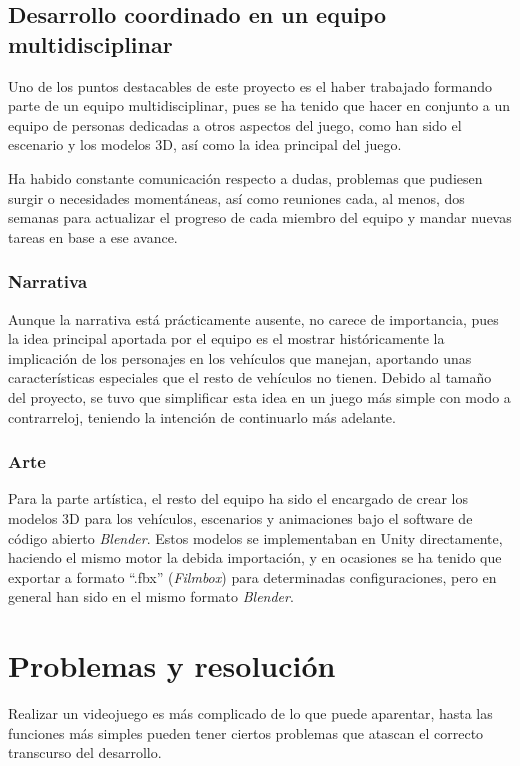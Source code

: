 \subsection{Desarrollo coordinado en un equipo multidisciplinar}

Uno de los puntos destacables de este proyecto es el haber trabajado formando parte de un equipo multidisciplinar, pues se ha tenido que hacer en conjunto a un equipo de personas dedicadas a otros aspectos del juego, como han sido el escenario y los modelos 3D, así como la idea principal del juego.

Ha habido constante comunicación respecto a dudas, problemas que pudiesen surgir o necesidades momentáneas, así como reuniones cada, al menos, dos semanas para actualizar el progreso de cada miembro del equipo y mandar nuevas tareas en base a ese avance.

\subsubsection{Narrativa}

Aunque la narrativa está prácticamente ausente, no carece de importancia, pues la idea principal aportada por el equipo es el mostrar históricamente la implicación de los personajes en los vehículos que manejan, aportando unas características especiales que el resto de vehículos no tienen. Debido al tamaño del proyecto, se tuvo que simplificar esta idea en un juego más simple con modo a contrarreloj, teniendo la intención de continuarlo más adelante.

\subsubsection{Arte}

Para la parte artística, el resto del equipo ha sido el encargado de crear los modelos 3D para los vehículos, escenarios y animaciones bajo el software de código abierto \textit{Blender}. Estos modelos se implementaban en Unity directamente, haciendo el mismo motor la debida importación, y en ocasiones se ha tenido que exportar a formato ``.fbx'' (\textit{Filmbox}) para determinadas configuraciones, pero en general han sido en el mismo formato \textit{Blender}.

\section{Problemas y resolución}

Realizar un videojuego es más complicado de lo que puede aparentar, hasta las funciones más simples pueden tener ciertos problemas que atascan el correcto transcurso del desarrollo.

